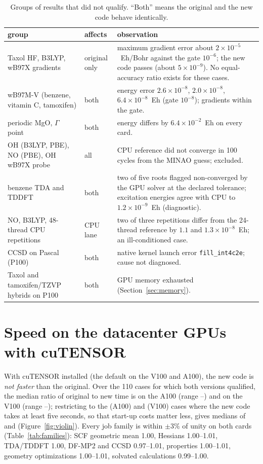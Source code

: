\begin{table}[!htbp]
\centering\small
\begin{tabular}{p{4.6cm}p{2.2cm}p{6.7cm}}
\toprule
group & affects & observation \\
\midrule
Taxol HF, B3LYP, wB97X gradients & original only & maximum gradient error about $2\times10^{-5}$~Eh/Bohr against the gate $10^{-6}$; the new code passes (about $5\times10^{-9}$). No equal-accuracy ratio exists for these cases. \\
wB97M-V (benzene, vitamin C, tamoxifen) & both & energy error $2.6\times10^{-8}$, $2.0\times10^{-8}$, $6.4\times10^{-8}$~Eh (gate $10^{-8}$); gradients within the gate. \\
periodic MgO, $\Gamma$ point & both & energy differs by $6.4\times10^{-2}$~Eh on every card. \\
OH (B3LYP, PBE), NO (PBE), OH wB97X probe & all & CPU reference did not converge in 100 cycles from the MINAO guess; excluded. \\
benzene TDA and TDDFT & both & two of five roots flagged non-converged by the GPU solver at the declared tolerance; excitation energies agree with CPU to $1.2\times10^{-9}$~Eh (diagnostic). \\
NO, B3LYP, 48-thread CPU repetitions & CPU lane & two of three repetitions differ from the 24-thread reference by $1.1$ and $1.3\times10^{-8}$~Eh; an ill-conditioned case. \\
CCSD on Pascal (P100) & both & native kernel launch error \texttt{fill\_int4c2e}; cause not diagnosed. \\
Taxol and tamoxifen/TZVP hybrids on P100 & both & GPU memory exhausted (Section~\ref{sec:memory}). \\
\bottomrule
\end{tabular}
\caption{Groups of results that did not qualify. ``Both'' means the original and the new code behave identically.}
\label{tab:failures}
\end{table}

\section{Speed on the datacenter GPUs with cuTENSOR}
\label{sec:speed}

With cuTENSOR installed (the default on the V100 and A100), the new code is \emph{not faster} than the original. Over the 110 cases for which both versions qualified, the median ratio of original to new time is \MedianAllAHund{} on the A100 (range \MinAllAHund--\MaxAllAHund) and \MedianAllVHund{} on the V100 (range \MinAllVHund--\MaxAllVHund); restricting to the \NBigAHund{} (A100) and \NBigVHund{} (V100) cases where the new code takes at least five seconds, so that start-up costs matter less, gives medians of \MedianBigAHund{} and \MedianBigVHund{} (Figure~\ref{fig:violin}). Every job family is within $\pm3\%$ of unity on both cards (Table~\ref{tab:families}): SCF geometric mean 1.00, Hessians 1.00--1.01, TDA/TDDFT 1.00, DF-MP2 and CCSD 0.97--1.01, properties 1.00--1.01, geometry optimizations 1.00--1.01, solvated calculations 0.99--1.00.

